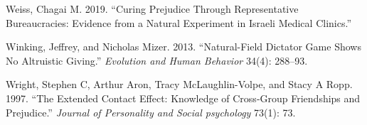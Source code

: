 \documentclass[11pt]{article}
\begin{document}
\leavevmode\hypertarget{ref-weiss2019curing}{}%
Weiss, Chagai M. 2019. ``Curing Prejudice Through Representative
Bureaucracies: Evidence from a Natural Experiment in Israeli Medical
Clinics.''

\leavevmode\hypertarget{ref-winking2013natural}{}%
Winking, Jeffrey, and Nicholas Mizer. 2013. ``Natural-Field Dictator
Game Shows No Altruistic Giving.'' \emph{Evolution and Human Behavior}
34(4): 288--93.

\leavevmode\hypertarget{ref-wright1997extended}{}%
Wright, Stephen C, Arthur Aron, Tracy McLaughlin-Volpe, and Stacy A
Ropp. 1997. ``The Extended Contact Effect: Knowledge of Cross-Group
Friendships and Prejudice.'' \emph{Journal of Personality and Social
psychology} 73(1): 73.
\end{document}
